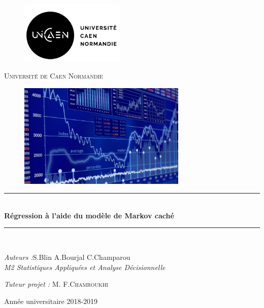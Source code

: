 \documentclass[11pt]{article}
\newcommand{\HRule}{\rule{\linewidth}{0.5mm}}
\begin{document}
\begin{titlepage}
\begin{center}
	\begin{figure}
		\begin{minipage}[c]{.46\linewidth}
      			\begin{flushleft}		
			\includegraphics[height=3cm]{unicaen.png}
	  		\end{flushleft}
    		\end{minipage}
		
    \end{figure}
    \textsc{\LARGE Université de Caen Normandie}\\[1cm]

\begin{figure}[h]
\begin{center}
\includegraphics[height=5cm]{img.jpg}
\end{center}
\end{figure}
    
    \HRule \\[0.4cm]
    { \huge \bfseries Régression à l'aide du modèle de Markov caché }

\HRule \\[6.5cm]


    
    \begin{minipage}{0.4\textwidth}
      \begin{flushleft} \large
        \emph{Auteurs :}S.Blin A.Bourjal C.Champarou\\
        \emph{M2 Statistiques Appliquées et Analyse Décisionnelle}
      \end{flushleft}
    \end{minipage}
    \begin{minipage}{0.4\textwidth}
      \begin{flushright} \large
        \emph{Tuteur projet :} M. \textsc{F.Chamroukhi}\\
      \end{flushright}
    \end{minipage}

    \vfill

    Année universitaire 2018-2019


\end{center}
\end{titlepage}
\end{document}
